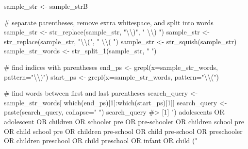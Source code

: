 \documentclass[
  letterpaper,
]{krantz}
\makeatletter
\newenvironment{Shaded}{\begin{snugshade}}{\end{snugshade}}
\newcommand{\AttributeTok}[1]{\textcolor[rgb]{0.40,0.45,0.13}{#1}}
\newcommand{\CommentTok}[1]{\textcolor[rgb]{0.37,0.37,0.37}{#1}}
\newcommand{\DecValTok}[1]{\textcolor[rgb]{0.68,0.00,0.00}{#1}}
\newcommand{\FunctionTok}[1]{\textcolor[rgb]{0.28,0.35,0.67}{#1}}
\newcommand{\NormalTok}[1]{\textcolor[rgb]{0.00,0.23,0.31}{#1}}
\newcommand{\OtherTok}[1]{\textcolor[rgb]{0.00,0.23,0.31}{#1}}
\newcommand{\SpecialCharTok}[1]{\textcolor[rgb]{0.37,0.37,0.37}{#1}}
\newcommand{\StringTok}[1]{\textcolor[rgb]{0.13,0.47,0.30}{#1}}
\newenvironment{kframe}{%
\medskip{}
\setlength{\fboxsep}{.8em}
 \def\at@end@of@kframe{}%
 \ifinner\ifhmode%
  \def\at@end@of@kframe{\end{minipage}}%
  \begin{minipage}{\columnwidth}%
 \fi\fi%
 \def\FrameCommand##1{\hskip\@totalleftmargin \hskip-\fboxsep
 \colorbox{shadecolor}{##1}\hskip-\fboxsep
     \hskip-\linewidth \hskip-\@totalleftmargin \hskip\columnwidth}%
 \MakeFramed {\advance\hsize-\width
   \@totalleftmargin\z@ \linewidth\hsize
   \@setminipage}}%
 {\par\unskip\endMakeFramed%
 \at@end@of@kframe}
\renewenvironment{Shaded}{\begin{kframe}}{\end{kframe}}
\makeatother
\begin{document}
\begin{Shaded}
\begin{Highlighting}[]
\NormalTok{sample\_str }\OtherTok{\textless{}{-}}\NormalTok{ sample\_strB}

\CommentTok{\# separate parentheses, remove extra whitespace, and split into words}
\NormalTok{sample\_str }\OtherTok{\textless{}{-}} \FunctionTok{str\_replace}\NormalTok{(sample\_str, }\StringTok{"}\SpecialCharTok{\textbackslash{}\textbackslash{}}\StringTok{)"}\NormalTok{, }\StringTok{" }\SpecialCharTok{\textbackslash{}\textbackslash{}}\StringTok{) "}\NormalTok{)}
\NormalTok{sample\_str }\OtherTok{\textless{}{-}} \FunctionTok{str\_replace}\NormalTok{(sample\_str, }\StringTok{"}\SpecialCharTok{\textbackslash{}\textbackslash{}}\StringTok{("}\NormalTok{, }\StringTok{" }\SpecialCharTok{\textbackslash{}\textbackslash{}}\StringTok{( "}\NormalTok{)}
\NormalTok{sample\_str }\OtherTok{\textless{}{-}} \FunctionTok{str\_squish}\NormalTok{(sample\_str)}
\NormalTok{sample\_str\_words }\OtherTok{\textless{}{-}} \FunctionTok{str\_split\_1}\NormalTok{(sample\_str, }\StringTok{" "}\NormalTok{)}

\CommentTok{\# find indices with parentheses }
\NormalTok{end\_ps }\OtherTok{\textless{}{-}} \FunctionTok{grepl}\NormalTok{(}\AttributeTok{x=}\NormalTok{sample\_str\_words, }\AttributeTok{pattern=}\StringTok{"}\SpecialCharTok{\textbackslash{}\textbackslash{}}\StringTok{)"}\NormalTok{)}
\NormalTok{start\_ps }\OtherTok{\textless{}{-}} \FunctionTok{grepl}\NormalTok{(}\AttributeTok{x=}\NormalTok{sample\_str\_words, }\AttributeTok{pattern=}\StringTok{"}\SpecialCharTok{\textbackslash{}\textbackslash{}}\StringTok{("}\NormalTok{)}

\CommentTok{\# find words between first and last parentheses }
\NormalTok{search\_query }\OtherTok{\textless{}{-}}\NormalTok{ sample\_str\_words[ }\FunctionTok{which}\NormalTok{(end\_ps)[}\DecValTok{1}\NormalTok{]}\SpecialCharTok{:}\FunctionTok{which}\NormalTok{(start\_ps)[}\DecValTok{1}\NormalTok{]]}
\NormalTok{search\_query }\OtherTok{\textless{}{-}} \FunctionTok{paste}\NormalTok{(search\_query, }\AttributeTok{collapse=}\StringTok{" "}\NormalTok{)}
\NormalTok{search\_query}
\CommentTok{\#\textgreater{} [1] ") adolescents OR adolescent OR children OR schooler pre OR pre{-}schooler OR children school pre OR child school pre OR children pre{-}school OR child pre{-}school OR preschooler OR children preschool OR child preschool OR infant OR child ("}


\end{Highlighting}
\end{Shaded}
\end{document}
